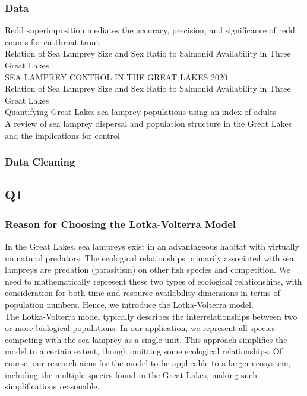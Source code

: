\documentclass[12pt]{article}
\begin{document}
\subsubsection*{Data}
Redd superimposition mediates the accuracy, precision, and significance of redd counts for cutthroat trout\\
Relation of Sea Lamprey Size and Sex Ratio to Salmonid Availability in Three Great Lakes \\
SEA LAMPREY CONTROL IN THE GREAT LAKES 2020 \\
Relation of Sea Lamprey Size and Sex Ratio to Salmonid Availability in Three Great Lakes \\
Quantifying Great Lakes sea lamprey populations using an index of adults\\
A review of sea lamprey dispersal and population structure in the Great Lakes and the implications for control \\
\subsubsection*{Data Cleaning}
\subsection{Q1}
\subsubsection{Reason for Choosing the Lotka-Volterra Model}
In the Great Lakes, sea lampreys exist in an advantageous habitat with virtually no natural predators. 
The ecological relationships primarily associated with sea lampreys are predation (parasitism) on other 
fish species and competition. We need to mathematically represent these two types of ecological 
relationships, with consideration for both time and resource availability dimensions in terms of 
population numbers. Hence, we introduce the Lotka-Volterra model.\\
The Lotka-Volterra model typically describes the interrelationships between two or more biological 
populations. In our application, we represent all species competing with the sea lamprey as a single 
unit. This approach simplifies the model to a certain extent, though omitting some ecological 
relationships. Of course, our research aims for the model to be applicable to a larger ecosystem, 
including the multiple species found in the Great Lakes, making such simplifications reasonable. 
\end{document}
